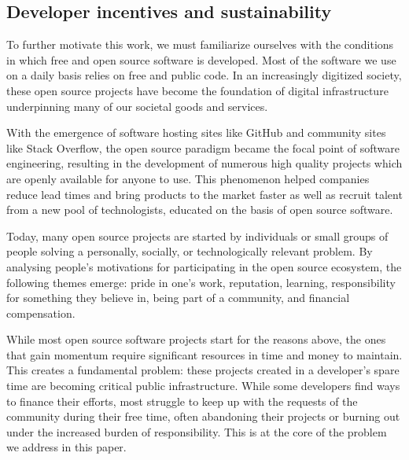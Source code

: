 \subsection{Developer incentives and sustainability}
\label{s:incentives}

To further motivate this work, we must familiarize ourselves with the
conditions in which free and open source software is developed. Most of the
software we use on a daily basis relies on free and public code. In an
increasingly digitized society, these open source projects have become the
foundation of digital infrastructure underpinning many of our societal goods
and services.

With the emergence of software hosting sites like GitHub and community sites
like Stack Overflow, the open source paradigm became the focal point of
software engineering, resulting in the development of numerous high quality
projects which are openly available for anyone to use. This phenomenon helped
companies reduce lead times and bring products to the market faster as well as
recruit talent from a new pool of technologists, educated on the basis of
open source software.

Today, many open source projects are started by individuals or small groups of
people solving a personally, socially, or technologically relevant problem. By
analysing people's motivations for participating in the open source ecosystem,
the following themes emerge: pride in one's work, reputation, learning,
responsibility for something they believe in, being part of a community, and
financial compensation.

While most open source software projects start for the reasons above, the ones
that gain momentum require significant resources in time and money to maintain.
This creates a fundamental problem: these projects created in a developer's
spare time are becoming critical public infrastructure. While some developers
find ways to finance their efforts, most struggle to keep up with the requests
of the community during their free time, often abandoning their projects or
burning out under the increased burden of responsibility.  This is at the core
of the problem we address in this paper.
